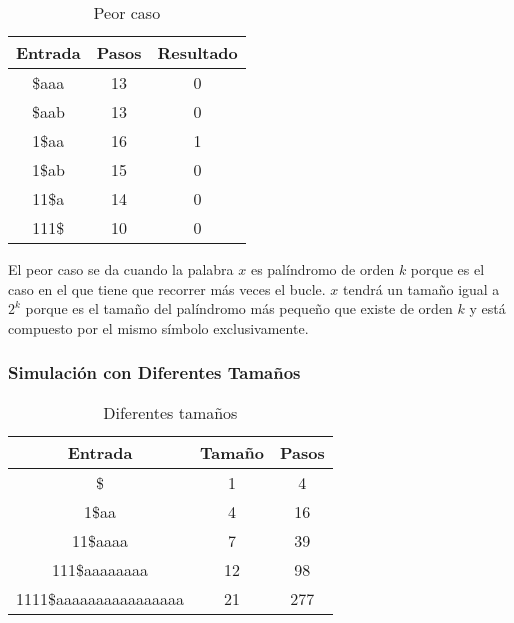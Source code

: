 \documentclass{uc3mpracticas}
\begin{document}
  \begin{table}[!h]
    \centering
  \begin{tabular}{|c|c|c|}
  \hline
  \textbf{Entrada} & \textbf{Pasos} & \textbf{Resultado} \\ \hline
  \$aaa   & 13             & 0                  \\ \hline
    \$aab   & 13             & 0                  \\ \hline
  1\$aa   & 16             & 1                  \\ \hline
  1\$ab            & 15             & 0                  \\ \hline
  11\$a            & 14             & 0                  \\ \hline
  111\$            & 10             & 0                  \\ \hline
  \end{tabular}
  \caption{Peor caso}
  \end{table}

  El peor caso se da cuando la palabra $x$ es palíndromo de orden $k$ porque es el caso en el que tiene que recorrer más veces el bucle. $x$ tendrá un tamaño igual a $2^k$ porque es el tamaño del palíndromo más pequeño que existe de orden $k$ y está compuesto por el mismo símbolo exclusivamente.


  \subsubsection{Simulación con Diferentes Tamaños}

  \begin{table}[!h]
    \centering
  \begin{tabular}{|c|c|c|}
  \hline
  \textbf{Entrada}       & \textbf{Tamaño} & \textbf{Pasos} \\ \hline
  \$            & 1               & 4              \\ \hline
  1\$aa         & 4               & 16             \\ \hline
  11\$aaaa      & 7               & 39             \\ \hline
  111\$aaaaaaaa          & 12              & 98             \\ \hline
  1111\$aaaaaaaaaaaaaaaa & 21              & 277            \\ \hline
  \end{tabular}
  \caption{Diferentes tamaños}
  \end{table}
\end{document}
